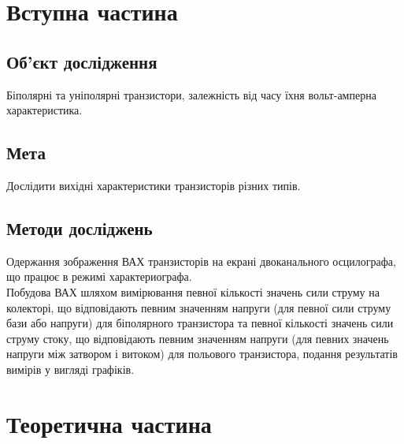 \section{Вступна частина}
\subsection{Об'єкт дослідження}
\setlength{\parindent}{4em}
\indent Біполярні та уніполярні транзистори, залежність від
часу їхня вольт-амперна характеристика.
\subsection{Мета}
\indent Дослідити вихідні характеристики транзисторів різних
типів.

\subsection{Методи досліджень}
\indent Одержання зображення ВАХ транзисторів на екрані двоканального
осцилографа, що працює в режимі характериографа. \\
Побудова ВАХ шляхом вимірювання певної кількості значень сили струму на
колекторі, що відповідають певним значенням напруги (для певної сили
струму бази або напруги) для біполярного транзистора та певної кількості
значень сили струму стоку, що відповідають певним значенням напруги (для
певних значень напруги між затвором і витоком) для польового транзистора,
подання результатів вимірів у вигляді графіків.

\newpage
\section{Теоретична частина}
